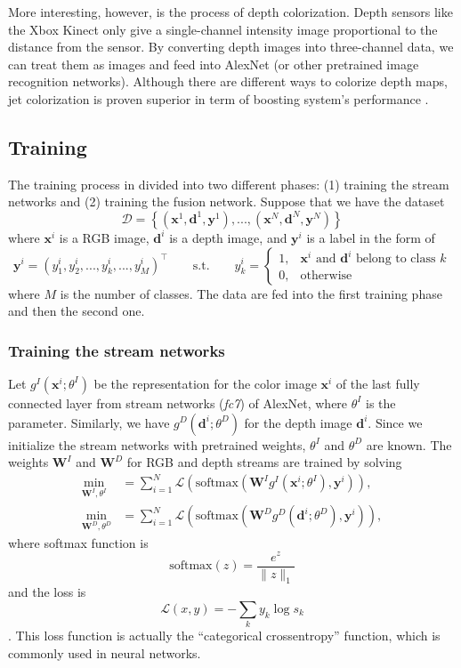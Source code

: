 More interesting, however, is the process of depth colorization. Depth sensors like the Xbox Kinect only give a single-channel intensity image proportional to the distance from the sensor. By converting depth images into three-channel data, we can treat them as images and feed into AlexNet (or other pretrained image recognition networks). Although there are different ways to colorize depth maps, jet colorization is proven superior in term of boosting system's performance \cite{Eitel2015}.







\subsection{Training}
The training process in divided into two different phases: (1) training the stream networks and (2) training the fusion network. Suppose that we have the dataset
\[ \mathcal{D} = \left\{ \left(\mathbf{x}^1, \mathbf{d}^1, \mathbf{y}^1\right), ..., \left(\mathbf{x}^N, \mathbf{d}^N, \mathbf{y}^N\right) \right\} \]
where $\mathbf{x}^i$ is a RGB image, $\mathbf{d}^i$ is a depth image, and $\mathbf{y}^i$ is a label in the form of
\[
\mathbf{y}^i = (y_1^i, y_2^i, ..., y_k^i, ..., y_{M}^i)^\top \qquad \text{s.t.} \qquad y_k^i = 
\begin{cases}
1, & \mathbf{x}^i \text{ and } \mathbf{d}^i \text{ belong to class } k\\
0, & \text{otherwise}
\end{cases}
\]
where $M$ is the number of classes. The data are fed into the first training phase and then the second one.

\subsubsection{Training the stream networks}
Let $g^I(\mathbf{x}^i; \theta^I)$ be the representation for the color image $\mathbf{x}^i$ of the last fully connected layer from stream networks (\textit{fc7}) of AlexNet, where $\theta^I$ is the parameter. Similarly, we have $g^D(\mathbf{d}^i; \theta^D)$ for the depth image $\mathbf{d}^i$. Since we initialize the stream networks with pretrained weights, $\theta^I$ and $\theta^D$ are known. The weights $\mathbf{W}^I$ and $\mathbf{W}^D$ for RGB and depth streams are trained by solving
\begin{align*}
	\min_{\mathbf{W}^I,\theta^I} &= \sum_{i=1}^N \mathcal{L} \left( \text{softmax}\left(\mathbf{W}^I g^I \left(\mathbf{x}^i; \theta^I\right), \mathbf{y}^i\right)\right), \\
	\min_{\mathbf{W}^D,\theta^D} &= \sum_{i=1}^N \mathcal{L} \left( \text{softmax}\left(\mathbf{W}^D g^D \left(\mathbf{d}^i; \theta^D\right), \mathbf{y}^i\right)\right),
\end{align*}
where softmax function is
\[ \text{softmax}(z) =\frac{e^z}{\lVert z \rVert_1} \]
and the loss is
\[ \mathcal{L}(x,y) = -\sum_k y_k \log s_k \].
This loss function is actually the ``categorical crossentropy'' function, which is commonly used in neural networks.

